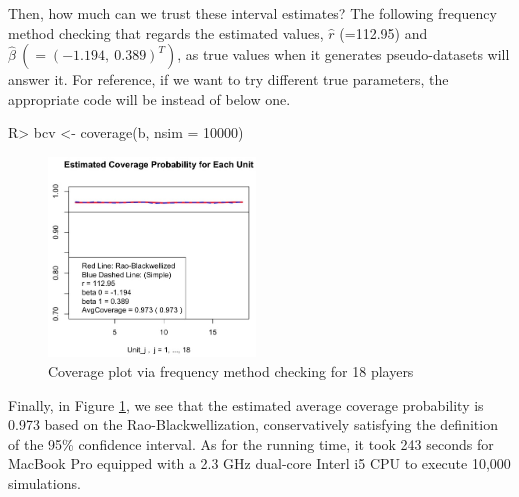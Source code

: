 \documentclass[article]{jss}
\begin{document}
Then, how much can we trust these interval estimates? The following frequency method checking that regards the estimated values, $\hat{r}$ (=112.95) and $\hat{\beta}~(=(-1.194, ~0.389)^{T})$, as true values when it generates pseudo-datasets will answer it. For reference, if we want to try different true parameters, the appropriate code will be  instead of below one.

\begin{CodeChunk}
\begin{CodeInput}
R> bcv <- coverage(b, nsim = 10000)
\end{CodeInput}
\end{CodeChunk}
\begin{figure}[h]
\begin{center}
\includegraphics[width = 5.5cm]{baseball2.png}
\caption{Coverage plot via frequency method checking for 18 players}
\label{fig:baseball2}
\end{center}
\end{figure}

Finally, in Figure \ref{fig:baseball2}, we see that the estimated average coverage probability is 0.973 based on the Rao-Blackwellization, conservatively satisfying the definition of the 95\% confidence interval. As for the running time, it took 243 seconds for MacBook Pro equipped with a 2.3 GHz dual-core Interl i5 CPU to execute 10,000 simulations.


\end{document}
